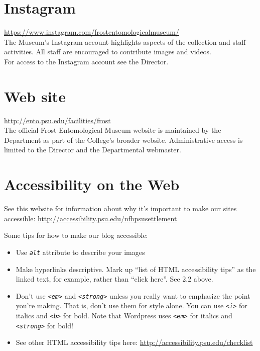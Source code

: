 \documentclass[letterpaper, 11pt]{article}
\newcommand{\vocab}[1]{\texttt{\itshape #1}}%
\begin{document}
\section{Instagram}
\url{https://www.instagram.com/frostentomologicalmuseum/}\\

\noindent{}The Museum's Instagram account highlights aspects of the collection and staff activities. All staff are encouraged to contribute images and videos.\\

\noindent{}For access to the Instagram account see the Director.

\section{Web site}
\url{http://ento.psu.edu/facilities/frost}\\

\noindent{}The official Frost Entomological Museum website is maintained by the Department as part of the College's broader website. Administrative access is limited to the Director and the Departmental webmaster.

\section{Accessibility on the Web}
See this website for information about why it's important to make our sites accessible: \url{http://accessibility.psu.edu/nfbpsusettlement}

\noindent{}Some tips for how to make our blog accessible:

\begin{itemize}
\item Use \vocab{alt} attribute to describe your images
\item Make hyperlinks descriptive. Mark up ``list of HTML accessibility tips'' as the linked text, for example, rather than ``click here''. See 2.2 above.
\item Don't use \vocab{<em>} and \vocab{<strong>} unless you really want to emphasize the point you're making. That is, don't use them for style alone. You can use \vocab{<i>} for italics and \vocab{<b>} for bold. Note that Wordpress uses \vocab{<em>} for italics and \vocab{<strong>} for bold!
\item See other HTML accessibility tips here: \url{http://accessibility.psu.edu/checklist}
\end{itemize}

%
%
\end{document}
